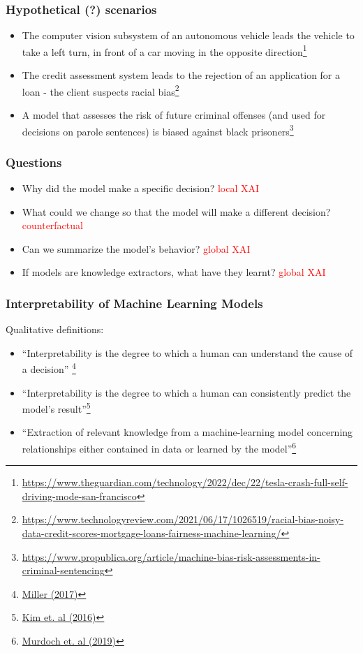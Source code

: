 \begin{frame}
  \frametitle{Hypothetical (?) scenarios}

  \begin{itemize}
  \item<1-> The computer vision subsystem of an autonomous vehicle leads the
    vehicle to take a left turn, in front of a car moving in the opposite direction\footnote{\url{https://www.theguardian.com/technology/2022/dec/22/tesla-crash-full-self-driving-mode-san-francisco}}
  \item<2-> The credit assessment system leads to the rejection of an
    application for a loan - the client suspects racial bias\footnote{\url{https://www.technologyreview.com/2021/06/17/1026519/racial-bias-noisy-data-credit-scores-mortgage-loans-fairness-machine-learning/}}
  \item<3-> A model that assesses the risk of future criminal offenses (and
    used for decisions on parole sentences) is biased against black
    prisoners\footnote{\url{https://www.propublica.org/article/machine-bias-risk-assessments-in-criminal-sentencing}}
  \end{itemize}

\end{frame}

\begin{frame}
  \frametitle{Questions}
  \begin{itemize}
  \item Why did the model make a specific decision? \textcolor{red}{local XAI}
  \item What could we change so that the model will make a different decision? \textcolor{red}{counterfactual}
  \item Can we summarize the model's behavior? \textcolor{red}{global XAI}
  \item If models are knowledge extractors, what have they learnt? \textcolor{red}{global XAI}
  \end{itemize}
\end{frame}

\begin{frame}
  \frametitle{Interpretability of Machine Learning Models}
  Qualitative definitions:
  \begin{itemize}
  \item<1-> ``Interpretability is the degree to which a human can understand the
    cause of a decision'' \footnote{\href{https://arxiv.org/abs/1706.07269}{Miller (2017)}}
  \item<2-> ``Interpretability is the degree to which a human can consistently
    predict the model’s result''\footnote{\href{https://papers.nips.cc/paper/2016/hash/5680522b8e2bb01943234bce7bf84534-Abstract.html}{Kim et. al (2016)}}
  \item<3-> ``Extraction of relevant knowledge from a machine-learning model
    concerning relationships either contained in data or learned by the
    model''\footnote{\href{https://www.pnas.org/doi/10.1073/pnas.1900654116}{Murdoch et. al (2019)}}
  \end{itemize}
\end{frame}


